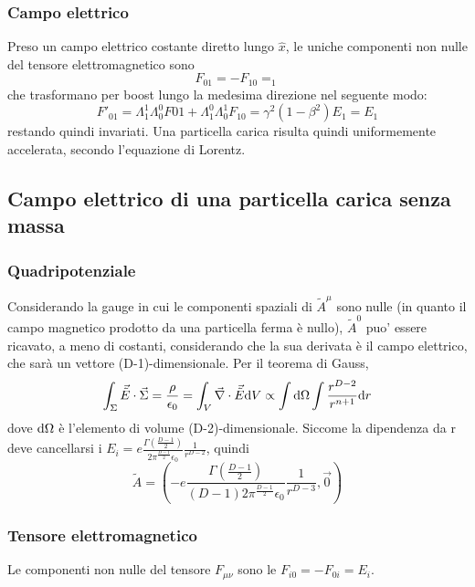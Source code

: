 \subsubsection{Campo elettrico}
Preso un campo elettrico costante diretto lungo $\hat{x}$, le uniche componenti non nulle del tensore elettromagnetico sono
\[ F_{01} = - F_{10} = _1 \]
che trasformano per boost lungo la medesima direzione nel seguente modo:
\[ F'_{01} = \Lambda^1_1\Lambda^0_0 F{01} + \Lambda^0_1\Lambda^1_0 F_{10} = \gamma^2(1-\beta^2)E_1 = E_1 \]
restando quindi invariati.
Una particella carica risulta quindi uniformemente accelerata, secondo l'equazione di Lorentz.






\subsection{ Campo elettrico di una particella carica senza massa}
\subsubsection{Quadripotenziale}
Considerando la gauge in cui le componenti spaziali di $\tilde{A}^\mu$ sono nulle (in quanto il campo magnetico prodotto da una particella ferma \`e nullo), $\tilde{A}^0$ puo' essere ricavato, a meno di costanti, considerando che la sua derivata \`e il campo elettrico, che sar\`a un vettore (D-1)-dimensionale. Per il teorema di Gauss,
\[ \int_\Sigma \vec{\tilde{E}}\cdot\vec{\Sigma} = \frac{\rho}{\epsilon_0} = \int_V \vec{\nabla}\cdot\vec{\tilde{E}} \mathrm{d} V \propto \int\mathrm{d}\Omega \int \frac{r^{D-2}}{r^{n+1}} \mathrm{d} r \]
dove $\mathrm{d}\Omega$ \`e l'elemento di volume (D-2)-dimensionale. Siccome la dipendenza da r deve cancellarsi i
\( E_i = e\frac{\Gamma(\frac{D-1}{2})}{2\pi^{\frac{D-1}{2}}\epsilon_0} \frac{1}{r^{D-2}} \), quindi
\[ \tilde{A} = (-e\frac{\Gamma(\frac{D-1}{2})}{(D-1)2\pi^{\frac{D-1}{2}}\epsilon_0} \frac{1}{r^{D-3}},\vec{0}) \]
\subsubsection{Tensore elettromagnetico}
Le componenti non nulle del tensore $F_{\mu\nu}$ sono le $F_{i0}=-F_{0i}=E_i$.

